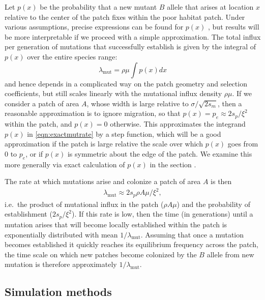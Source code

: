 \documentclass{article}
\newcommand{\citep}[1]{\cite{#1}}
\newcommand{\mutrate}{\lambda_\text{mut}}
\begin{document}
Let $p(x)$ be the probability that a new mutant $B$ allele that arises at location $x$
relative to the center of the patch fixes within the poor habitat patch.
Under various assumptions, precise expressions can be found for $p(x)$ \citep{barton1987establishment},
but results will be more interpretable if we proceed with a simple approximation.
The total influx per generation of mutations that successfully establish is given by the
integral of $p(x)$ over the entire species range:
\begin{equation}
  \mutrate = \rho \mu \int p(x) dx \label{eqn:exactmutrate}
\end{equation}
and hence depends in a complicated way on the patch geometry and selection coefficients,
but still scales linearly with the mutational influx density $\rho \mu$.
If we consider a patch of area $A$, whose width is large relative to $\sigma/\sqrt{2s_m}$, 
then a reasonable approximation is to ignore migration, 
so that $p(x) = p_e \approx 2 s_p / \xi^2$ within the patch, and $p(x) = 0$ otherwise.
This approximates the integrand $p(x)$ in \eqref{eqn:exactmutrate} by a step function,
which will be a good approximation if the patch is large relative the scale over which $p(x)$ goes from 0 to $p_e$,
or if $p(x)$ is symmetric about the edge of the patch.
We examine this more generally via exact calculation of $p(x)$ in the section .

The rate at which mutations arise and colonize a patch of area $A$ is then
\begin{align} \label{eqn:mutrate} 
  \mutrate %
  \approx 2 s_p \rho A \mu / \xi^2,  
\end{align}
i.e.\ the product of mutational influx in the patch ($\rho A\mu$) and the probability of establishment ($2s_p/\xi^2$).
If this rate is low, then the time (in generations) until a mutation arises that
will become locally established within the patch is exponentially distributed with mean $1/\mutrate$.  
Assuming that once a mutation becomes established it quickly reaches its equilibrium frequency across the patch, 
the time scale on which new patches become colonized by the $B$ allele from new mutation is therefore approximately $1/\mutrate$.

\subsection{Simulation methods}
\label{ss:simulations}
\end{document}
